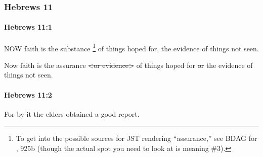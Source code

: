 	\subsubsection{Hebrews 11} %
		\label{HEBREWS-11}
		
		\paragraph{Hebrews 11:1} %
			\label{HEBREWS-11-1}

			NOW faith is the substance%
				\footnote{%
					To get into the possible sources for JST rendering ``assurance,'' see BDAG for , 925b (though the actual spot you need to look at is meaning \#3).
					}
			of things hoped for, the evidence of things not seen.

			\begin{framed}
			\scriptsize
				\begin{compactdesc}
					\item[SBLG] 
					\item[NTR2] Now faith is the assurance \sout{<or evidence>} of things hoped for \sout{or} the evidence of things not seen.
				\end{compactdesc}
			\end{framed}

		\paragraph{Hebrews 11:2} %
			\label{HEBREWS-11-2}

			For by it the elders obtained a good report.

